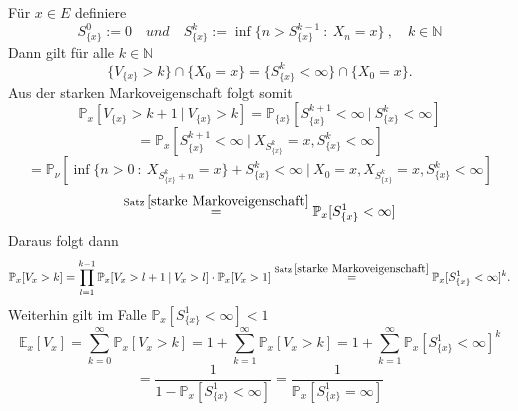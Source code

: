 Für $x \in E$ definiere 
\begin{equation*}
S_{\lbrace x \rbrace}^{0} := 0 \quad und \quad S_{\lbrace x \rbrace}^{k} := \inf \lbrace n > S_{\lbrace x \rbrace}^{k-1} \: : \: X_{n} = x \rbrace \: , \quad k \in \mathbb{N}
\end{equation*}
Dann gilt für alle $k \in \mathbb{N}$
\begin{equation*}
\lbrace V_{ \lbrace x \rbrace} > k \rbrace \cap \lbrace X_{0} = x \rbrace = \lbrace S_{\lbrace x \rbrace}^{k} < \infty \rbrace \cap \lbrace X_{0} = x \rbrace .
\end{equation*}
Aus der starken Markoveigenschaft folgt somit
\begin{equation*}
\mathbb{P}_{x}[V_{ \lbrace x \rbrace} > k+1 \: | \: V_{ \lbrace x \rbrace} > k] = \mathbb{P}_{\lbrace x \rbrace}[S_{\lbrace x \rbrace}^{k+1} < \infty \: | \: S_{\lbrace x \rbrace}^{k} < \infty] 
\end{equation*}
\begin{equation*}
= \mathbb{P}_{x}[S_{\lbrace x \rbrace}^{k+1} < \infty \: | \: X_{S_{\lbrace x \rbrace}^{k}} = x, S_{\lbrace x \rbrace}^{k} < \infty]
\end{equation*}
\begin{equation*}
= \mathbb{P}_{\nu}[\inf \lbrace n>0 \: : \: X_{S_{\lbrace x \rbrace}^{k} + n} = x \rbrace + S_{\lbrace x \rbrace}^{k} < \infty  \: | \: X_{0} = x,X_{S_{\lbrace x \rbrace}^{k}} = x, S_{\lbrace x \rbrace}^{k} < \infty]
\end{equation*}
\begin{equation*}
\stackrel{\mathrm{Satz} \: \ref{starke Markoveigenschaft}}{=} \mathbb{P}_{x}[S_{\lbrace x \rbrace}^{1} < \infty]
\end{equation*}
Daraus folgt dann
\begin{equation*}
\mathbb{P}_{x}[V_{x} > k] = \prod_{l=1}^{k-1} \mathbb{P}_{x}[V_{x} > l + 1 \: | \: V_{x} > l] \cdot \mathbb{P}_{x}[V_{x} > 1] \stackrel{\mathrm{Satz} \: \ref{starke Markoveigenschaft}}{=} \mathbb{P}_{x}[S_{\lbrace x \rbrace}^{1} < \infty]^{k}.
\end{equation*}
Weiterhin gilt im Falle $\mathbb{P}_{x}[S_{\lbrace x \rbrace}^{1} < \infty] < 1$
\begin{equation*}
\mathbb{E}_{x}[V_{x}] = \sum_{k=0}^{\infty}\mathbb{P}_{x}[V_{x} > k] = 1 + \sum_{k=1}^{\infty}\mathbb{P}_{x}[V_{x} > k] = 1 + \sum_{k=1}^{\infty}\mathbb{P}_{x}[S_{\lbrace x \rbrace}^{1} < \infty]^{k}
\end{equation*}
\begin{equation*}
= \dfrac{1}{1-\mathbb{P}_{x}[S_{\lbrace x \rbrace}^{1} < \infty]} = \dfrac{1}{\mathbb{P}_{x}[S_{\lbrace x \rbrace}^{1} = \infty]}
\end{equation*}